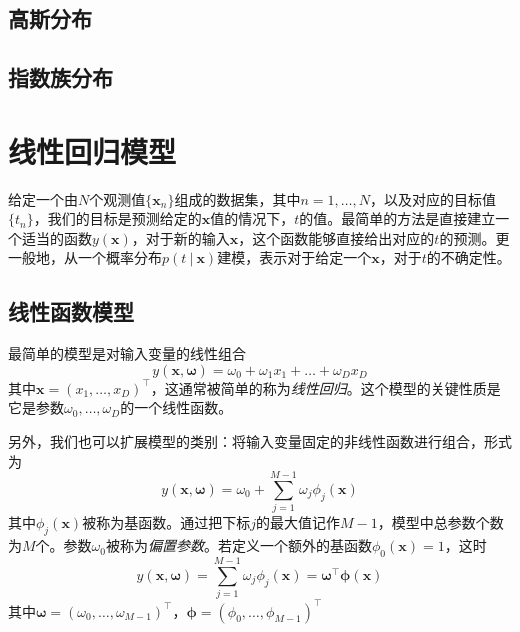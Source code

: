 \documentclass[11pt]{ctexbook}
\begin{document}
\section{高斯分布}
\section{指数族分布}

\chapter{线性回归模型}
给定一个由$N$个观测值$\{\bm x_n\}$组成的数据集，其中$n=1, \ldots, N$，以及对应的目标值$\{t_n\}$，我们的目标是预测给定的$\bm x$值的情况下，$t$的值。最简单的方法是直接建立一个适当的函数$y(\bm x)$，对于新的输入$\bm x$，这个函数能够直接给出对应的$t$的预测。更一般地，从一个概率分布$p(t\ |\ \bm x)$建模，表示对于给定一个$\bm x$，对于$t$的不确定性。
\section{线性函数模型}
最简单的模型是对输入变量的线性组合
\begin{equation}
	y(\bm x, \bm \omega) = \omega_0 + \omega_1 x_1 + \ldots +\omega_D x_D
\end{equation}
其中$\bm x=(x_1, \ldots, x_D)^\top$，这通常被简单的称为\emph{线性回归}。这个模型的关键性质是它是参数$\omega_0, \ldots, \omega_D$的一个线性函数。

另外，我们也可以扩展模型的类别：将输入变量固定的非线性函数进行组合，形式为
\begin{equation}
	y(\bm x,\bm \omega) = \omega_0 + \sum_{j=1}^{M-1}\omega_j\phi_j(\bm x)
\end{equation}
其中$\phi_j(\bm x)$被称为基函数。通过把下标$j$的最大值记作$M-1$，模型中总参数个数为$M$个。参数$\omega_0$被称为\emph{偏置参数}。若定义一个额外的基函数$\phi_0(\bm x)=1$，这时
\begin{equation}
	y(\bm x, \bm \omega) = \sum_{j=1}^{M-1}\omega_j\phi_j(\bm x) = \bm \omega^\top\bm \phi(\bm x)
\end{equation}
其中$\bm\omega=(\omega_0, \ldots, \omega_{M-1})^\top$，$\bm \phi =(\phi_0, \ldots, \phi_{M-1})^\top$
\end{document}
